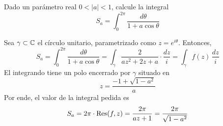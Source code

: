 \begin{exercise}
Dado un parámetro real $0 < |a| < 1$, calcule la integral
$$S_a = \int_0^{2\pi} \frac {d\theta} {1 + a \cos \theta}$$
\end{exercise}

\begin{solution}
Sea $\gamma \subset \mathbb C$ el círculo unitario, parametrizado como $z = e^{i\theta}$. Entonces,
$$
S_a
    = \int_0^{2\pi} \frac {d\theta} {1 + a \cos \theta}
    = \int_\gamma \frac 2 {az^2 + 2z + a} \cdot \frac {dz} i
    = \int_\gamma f(z) \, \frac {dz} i
$$
El integrando tiene un polo encerrado por $\gamma$ situado en
$$z = \frac {-1 + \sqrt {1 - a^2}} a$$
Por ende, el valor de la integral pedida es
$$S_a = 2\pi \cdot \operatorname{Res}(f, z) = \frac {2\pi} {az + 1} = \frac {2\pi} {\sqrt {1 - a^2}}$$
\end{solution}
